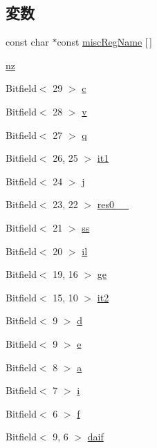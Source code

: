 \subsection*{変数}
\begin{DoxyCompactItemize}
\item 
const char $\ast$const \hyperlink{namespaceArmISA_a04c005fb6a06cbd3e27052b373f4dcfc}{miscRegName} \mbox{[}$\,$\mbox{]}
\item 
\hyperlink{namespaceArmISA_a79f11413e5bfe18a0e71e17574399ad5}{nz}
\item 
Bitfield$<$ 29 $>$ \hyperlink{namespaceArmISA_a29b9f05234a93d5391014a3cfc5658b1}{c}
\item 
Bitfield$<$ 28 $>$ \hyperlink{namespaceArmISA_ad5f56baee4d3318d20e008bed3480804}{v}
\item 
Bitfield$<$ 27 $>$ \hyperlink{namespaceArmISA_a853401ad1c480843ad53caaa0198fd05}{q}
\item 
Bitfield$<$ 26, 25 $>$ \hyperlink{namespaceArmISA_ae93cc5bbd5a4c256365a9b161cba9429}{it1}
\item 
Bitfield$<$ 24 $>$ \hyperlink{namespaceArmISA_adda8322536e2853111a71e4e2f911762}{j}
\item 
Bitfield$<$ 23, 22 $>$ \hyperlink{namespaceArmISA_af3e180e9816e02aa6c0af29f0f6afd28}{res0\_\_}
\item 
Bitfield$<$ 21 $>$ \hyperlink{namespaceArmISA_a947232c56fc3fcfcef3ee43afafcc4a6}{ss}
\item 
Bitfield$<$ 20 $>$ \hyperlink{namespaceArmISA_a6307ad38808da549a3479b75c976623b}{il}
\item 
Bitfield$<$ 19, 16 $>$ \hyperlink{namespaceArmISA_a92db3ffcccfd664603b50913a5c871fe}{ge}
\item 
Bitfield$<$ 15, 10 $>$ \hyperlink{namespaceArmISA_af8da3b36ad47ec3c90fe4a9475de2d51}{it2}
\item 
Bitfield$<$ 9 $>$ \hyperlink{namespaceArmISA_a780d191da4f56c853452d790bddbacb1}{d}
\item 
Bitfield$<$ 9 $>$ \hyperlink{namespaceArmISA_a55520507919005a961edbe8b177f3bba}{e}
\item 
Bitfield$<$ 8 $>$ \hyperlink{namespaceArmISA_a468da4d7330577ee8746df2acfa40959}{a}
\item 
Bitfield$<$ 7 $>$ \hyperlink{namespaceArmISA_aca8175497376fbb9f0e71fefa122cef7}{i}
\item 
Bitfield$<$ 6 $>$ \hyperlink{namespaceArmISA_ac1e4a6891d41a331cd7184329e5416ec}{f}
\item 
Bitfield$<$ 9, 6 $>$ \hyperlink{namespaceArmISA_abf7631b75e12aa626038bf65991dd9ea}{daif}

\end{DoxyCompactItemize}
